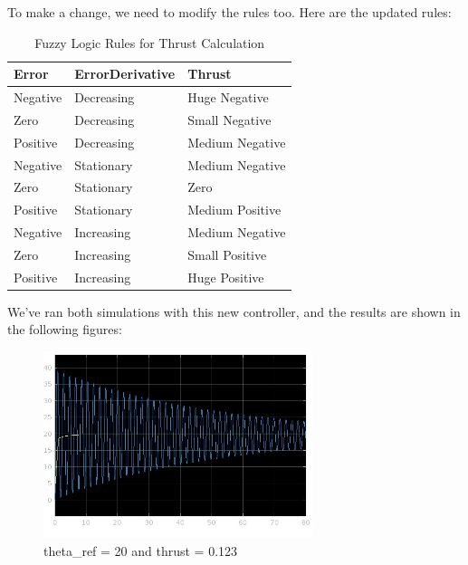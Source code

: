 \documentclass[12pt]{article}
\begin{document}
To make a change, we need to modify the rules too. Here are the updated rules:

\begin{table}[h!]
    \centering
    \renewcommand{\arraystretch}{1.25} %
    \setlength{\tabcolsep}{10pt}      %
    \begin{tabular}{|p{3cm}|p{4cm}|p{5cm}|}
    \hline
    \textbf{\large Error} & \textbf{\large ErrorDerivative} & \textbf{\large Thrust} \\ \hline
    \large Negative       & \large Decreasing               & \large Huge Negative    \\ \hline
    \large Zero           & \large Decreasing               & \large Small Negative   \\ \hline
    \large Positive       & \large Decreasing               & \large Medium Negative  \\ \hline
    \large Negative       & \large Stationary               & \large Medium Negative  \\ \hline
    \large Zero           & \large Stationary               & \large Zero             \\ \hline
    \large Positive       & \large Stationary               & \large Medium Positive  \\ \hline
    \large Negative       & \large Increasing               & \large Medium Negative  \\ \hline
    \large Zero           & \large Increasing               & \large Small Positive   \\ \hline
    \large Positive       & \large Increasing               & \large Huge Positive    \\ \hline
    \end{tabular}
    \caption{Fuzzy Logic Rules for Thrust Calculation}
    \label{tab:rules}
\end{table}

We've ran both simulations with this new controller, and the results are shown in the following figures:

\begin{figure}[h!]
    \centering
    \includegraphics[width=0.7\textwidth]{complex1.jpg}
    \caption{theta\_ref = 20 and thrust = 0.123}
    \label{fig:complex1}
\end{figure}
\vspace{1cm}
\end{document}
